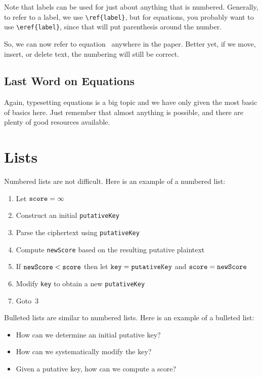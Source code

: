 Note that labels can be used for
just about anything that is numbered. Generally, to refer to a label,
we use \verb+\ref{label}+, but for equations, you probably want to use
\verb+\eref{label}+, since that will put parenthesis around the number.

So, we can now refer to equation~ anywhere in the paper.
Better yet, if we move, insert, or delete text, the numbering will still be correct.


\subsection{Last Word on Equations}

Again, typesetting equations is a big topic and we have only given the most basic
of basics here. Just remember that almost anything is possible, and there
are plenty of good resources available. 


\section{Lists}

Numbered lists are not difficult. Here is an example
of a numbered list:
\begin{enumerate}
\item Let $\mbox{\tt score} = \infty$
\item Construct an initial {\tt putativeKey} 
\item Parse the ciphertext using {\tt putativeKey}
\item Compute {\tt newScore} based on the resulting putative plaintext
\item If $\mbox{\tt newScore} < \mbox{\tt score}$ then 
let $\mbox{\tt key} = \mbox{\tt putativeKey}$ and $\mbox{\tt score} = \mbox{\tt newScore}$
\item Modify {\tt key} to obtain a new {\tt putativeKey}
\item Goto~3
\end{enumerate}

Bulleted lists are similar to numbered lists. Here is an example of a bulleted list:
\begin{itemize}
\item How can we determine an initial putative key?
\item  How can we systematically modify the key?
\item Given a putative key, how can we compute a score?
\end{itemize}


